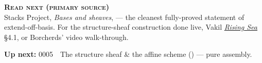 \begin{primarybox}
\textbf{\textsc{Read next (primary source)}}\\[2pt]
Stacks Project, \emph{Bases and sheaves},  --- the cleanest fully-proved statement of
extend-off-basis. For the structure-sheaf construction done live, Vakil
\href{https://math.stanford.edu/~vakil/216blog/FOAGaug2922public.pdf}{\emph{Rising Sea}} \S4.1, or
Borcherds' video walk-through.
\end{primarybox}

\noindent\textbf{Up next:} 0005 \,\textperiodcentered\, The structure sheaf \& the affine scheme
() --- pure assembly.
